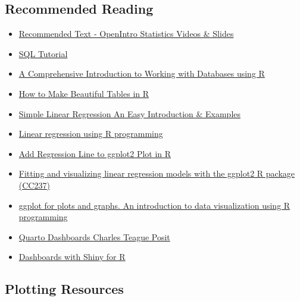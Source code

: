\documentclass[
  letterpaper,
  DIV=11,
  numbers=noendperiod]{scrartcl}
\providecommand{\tightlist}{%
  \setlength{\itemsep}{0pt}\setlength{\parskip}{0pt}}\usepackage{longtable,booktabs,array}
\begin{document}
\hypertarget{recommended-reading}{%
\subsection{Recommended Reading}\label{recommended-reading}}

\begin{itemize}
\tightlist
\item
  \href{https://www.openintro.org/book/os/}{Recommended Text - OpenIntro
  Statistics Videos \& Slides}
\item
  \href{https://www.w3schools.com/sql/}{SQL Tutorial}
\item
  \href{https://blog.rsquaredacademy.com/working-with-databases-using-r/}{A
  Comprehensive Introduction to Working with Databases using R}
\item
  \href{https://rfortherestofus.com/2019/11/how-to-make-beautiful-tables-in-r\#:~:text=kable\%20\%2B\%20kableExtra\&text=The\%20goal\%20of\%20kableExtra\%20is,similar\%20with\%20ggplot2\%20and\%20plotly\%20.}{How
  to Make Beautiful Tables in R}
\item
  \href{https://www.scribbr.com/statistics/simple-linear-regression/}{Simple
  Linear Regression \textbar{} An Easy Introduction \& Examples}
\item
  \href{https://youtu.be/-mGXnm0fHtI}{Linear regression using R
  programming}
\item
  \href{https://www.geeksforgeeks.org/add-regression-line-to-ggplot2-plot-in-r/}{Add
  Regression Line to ggplot2 Plot in R}
\item
  \href{https://youtu.be/1Vs-ckEI94M}{Fitting and visualizing linear
  regression models with the ggplot2 R package (CC237)}
\item
  \href{https://youtu.be/HPJn1CMvtmI\%5D}{ggplot for plots and graphs.
  An introduction to data visualization using R programming}
\item
  \href{https://www.youtube.com/watch?v=_VGJIPRGTy4}{Quarto Dashboards
  \textbar{} Charles Teague \textbar{} Posit}
\item
  \href{https://quarto.org/docs/dashboards/interactivity/shiny-r.html}{Dashboards
  with Shiny for R}
\end{itemize}

\hypertarget{plotting-resources}{%
\subsection{Plotting Resources}\label{plotting-resources}}
\end{document}
